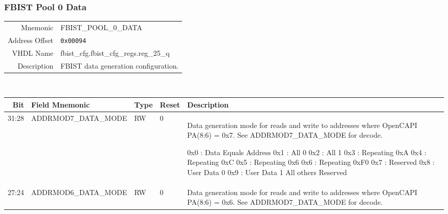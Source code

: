 \subsubsection{FBIST Pool 0 Data}
\begin{tabular}{ r | p{350px} }
  Mnemonic       & FBIST\_POOL\_0\_DATA                    \\
  Address Offset & \texttt{0x00094}                        \\
  VHDL Name      &  fbist\_cfg.fbist\_cfg\_regs.reg\_25\_q \\ \hline

  Description &
  FBIST data generation configuration. \\
\end{tabular}
\\
\begin{tabularx}{\textwidth}{r|l|l|l|X}
  \hline
  Bit   & Field Mnemonic       & Type & Reset & Description \\ \hline

  31:28 & ADDRMOD7\_DATA\_MODE & RW   & 0     &

  Data generation mode for reads and write to addresses where OpenCAPI
  PA(8:6) = 0x7. See ADDRMOD7\_DATA\_MODE for decode.

  \setlength\parindent{24pt}
  \indent 0x0 : Data Equals Address \newline
  \indent 0x1 : All 0               \newline
  \indent 0x2 : All 1               \newline
  \indent 0x3 : Repeating 0xA       \newline
  \indent 0x4 : Repeating 0xC       \newline
  \indent 0x5 : Repeating 0x6       \newline
  \indent 0x6 : Repeating 0xF0      \newline
  \indent 0x7 : Reserved            \newline
  \indent 0x8 : User Data 0         \newline
  \indent 0x9 : User Data 1         \newline
  \indent All others Reserved       \\

  27:24 & ADDRMOD6\_DATA\_MODE & RW   & 0     &

  Data generation mode for reads and write to addresses where OpenCAPI
  PA(8:6) = 0x6. See ADDRMOD7\_DATA\_MODE for decode. \\


\end{tabularx}
